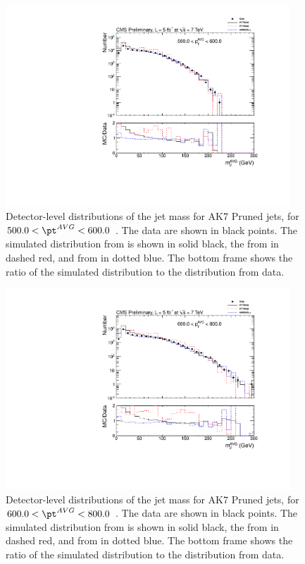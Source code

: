 \begin{figure}[htbp]
\centering
\includegraphics[width=0.95\textwidth]{figs/histAK7MjetVsPtAvg_rawDataMCComparisons_pt_7_Pruned}
\caption{Detector-level distributions of the jet mass for AK7 Pruned jets,
for $500.0 < \pt^{AVG} < 600.0$ \GeVc. The data are shown in black points.
The simulated distribution from \PYTHIA is shown in solid black, 
the from \PYTHIAEIGHT in dashed red, and from \HERWIG in dotted blue. 
The bottom frame shows the ratio of the simulated distribution
to the distribution from data. 
\label{figs:histAK7MjetVsPtAvg_rawDataMCComparisons_pt_7_Pruned}}
\end{figure}



\begin{figure}[htbp]
\centering
\includegraphics[width=0.95\textwidth]{figs/histAK7MjetVsPtAvg_rawDataMCComparisons_pt_8_Pruned}
\caption{Detector-level distributions of the jet mass for AK7 Pruned jets,
for $600.0 < \pt^{AVG} < 800.0$ \GeVc. The data are shown in black points.
The simulated distribution from \PYTHIA is shown in solid black, 
the from \PYTHIAEIGHT in dashed red, and from \HERWIG in dotted blue. 
The bottom frame shows the ratio of the simulated distribution
to the distribution from data. 
\label{figs:histAK7MjetVsPtAvg_rawDataMCComparisons_pt_8_Pruned}}
\end{figure}



